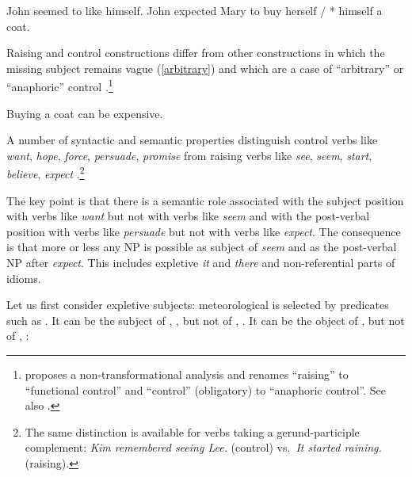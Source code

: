 \eal
\ex John seemed to like himself.\label{ex-john-seemed-to-like-himself}
\ex John expected Mary to buy herself / * himself a coat. \label{exp}
\zl
 
Raising and control constructions differ from other constructions in which the missing subject
remains vague (\ref{arbitrary}) and which are a case of ``arbitrary'' or ``anaphoric'' control
\parencites[--76]{Chomsky1981}[]{Bresnan1982}.\footnote{\citet{Bresnan1982} proposes
  a non-transformational analysis and renames ``raising'' to ``functional control'' and ``control''
  (obligatory) to ``anaphoric control''. See also .} 
 
\ea
Buying a coat can be expensive.\label{arbitrary}
\z
  
A number of syntactic and semantic properties distinguish control verbs like \emph{want}, \emph{hope},
\emph{force}, \emph{persuade}, \emph{promise} from raising verbs like \emph{see},
\emph{seem}, \emph{start}, \emph{believe}, \emph{expect} \citep{Rosenbaum67a-u,Postal1974,Bresnan1982}.\footnote{%
  The same distinction is available for verbs taking a gerund-participle complement: 
  \emph{Kim remembered seeing Lee.} (control) vs.\  \emph{It started raining.} (raising).}

The key point is that there is a semantic role associated with the subject position with verbs like
\emph{want} but not with verbs like \emph{seem} and with the post-verbal position with verbs like
\emph{persuade} but not with verbs like \emph{expect}.  The consequence is that more or less any NP
is possible as subject of \emph{seem} and as the post-verbal NP after \emph{expect}. This includes
expletive \emph{it} and \emph{there} and non-referential parts of idioms.

Let us first consider expletive subjects: meteorological  is selected by predicates
such as . It can be the subject of , , but not of ,
. It can be the object of ,  but not of ,
:
	

